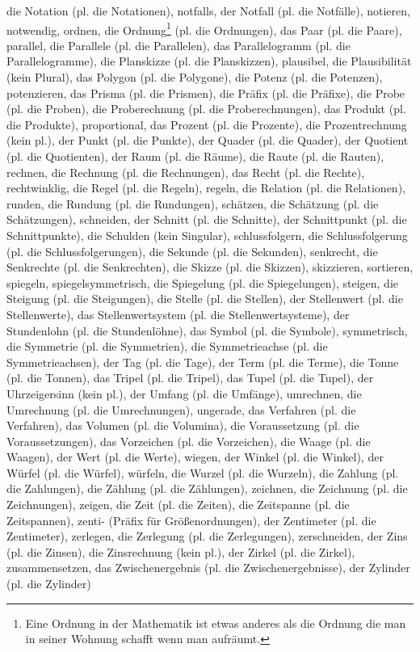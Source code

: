 die Notation (pl. die Notationen),
notfalls,
der Notfall (pl. die Notfälle),
notieren,
notwendig,
ordnen,
die Ordnung\footnote{Eine Ordnung in der Mathematik ist etwas anderes als die Ordnung die man in seiner Wohnung schafft wenn man aufräumt.} (pl. die Ordnungen),
das Paar (pl. die Paare),
parallel,
die Parallele (pl. die Parallelen),
das Parallelogramm (pl. die Parallelogramme),
die Planskizze (pl. die Planskizzen),
plausibel,
die Plausibilität (kein Plural),
das Polygon (pl. die Polygone),
die Potenz (pl. die Potenzen),
potenzieren,
das Prisma (pl. die Prismen),
die Präfix (pl. die Präfixe),
die Probe (pl. die Proben),
die Proberechnung (pl. die Proberechnungen),
das Produkt (pl. die Produkte),
proportional,
das Prozent (pl. die Prozente),
die Prozentrechnung (kein pl.),
der Punkt (pl. die Punkte),
der Quader (pl. die Quader),
der Quotient (pl. die Quotienten),
der Raum (pl. die Räume),
die Raute (pl. die Rauten),
rechnen,
die Rechnung (pl. die Rechnungen),
das Recht (pl. die Rechte),
rechtwinklig,
die Regel (pl. die Regeln),
regeln,
die Relation (pl. die Relationen),
runden,
die Rundung (pl. die Rundungen),
schätzen,
die Schätzung (pl. die Schätzungen),
schneiden,
der Schnitt (pl. die Schnitte),
der Schnittpunkt (pl. die Schnittpunkte),
die Schulden (kein Singular),
schlussfolgern,
die Schlussfolgerung (pl. die Schlussfolgerungen),
die Sekunde (pl. die Sekunden),
senkrecht,
die Senkrechte (pl. die Senkrechten),
die Skizze (pl. die Skizzen),
skizzieren,
sortieren,
spiegeln,
spiegelsymmetrisch,
die Spiegelung (pl. die Spiegelungen),
steigen,
die Steigung (pl. die Steigungen),
die Stelle (pl. die Stellen),
der Stellenwert (pl. die Stellenwerte),
das Stellenwertsystem (pl. die Stellenwertsysteme),
der Stundenlohn (pl. die Stundenlöhne),
das Symbol (pl. die Symbole),
symmetrisch,
die Symmetrie (pl. die Symmetrien),
die Symmetrieachse (pl. die Symmetrieachsen),
der Tag (pl. die Tage),
der Term (pl. die Terme),
die Tonne (pl. die Tonnen),
das Tripel (pl. die Tripel),
das Tupel (pl. die Tupel),
der Uhrzeigersinn (kein pl.),
der Umfang (pl. die Umfänge),
umrechnen,
die Umrechnung (pl. die Umrechnungen),
ungerade,
das Verfahren (pl. die Verfahren),
das Volumen (pl. die Volumina),
die Voraussetzung (pl. die Voraussetzungen),
das Vorzeichen (pl. die Vorzeichen),
die Waage (pl. die Waagen),
der Wert (pl. die Werte),
wiegen,
der Winkel (pl. die Winkel),
der Würfel (pl. die Würfel),
würfeln,
die Wurzel (pl. die Wurzeln),
die Zahlung (pl. die Zahlungen),
die Zählung (pl. die Zählungen),
zeichnen,
die Zeichnung (pl. die Zeichnungen),
zeigen,
die Zeit (pl. die Zeiten),
die Zeitspanne (pl. die Zeitspannen),
zenti- (Präfix für Größenordnungen),
der Zentimeter (pl. die Zentimeter),
zerlegen,
die Zerlegung (pl. die Zerlegungen),
zerschneiden,
der Zins (pl. die Zinsen),
die Zinsrechnung (kein pl.),
der Zirkel (pl. die Zirkel),
zusammensetzen,
das Zwischenergebnis (pl. die Zwischenergebnisse),
der Zylinder (pl. die Zylinder) 